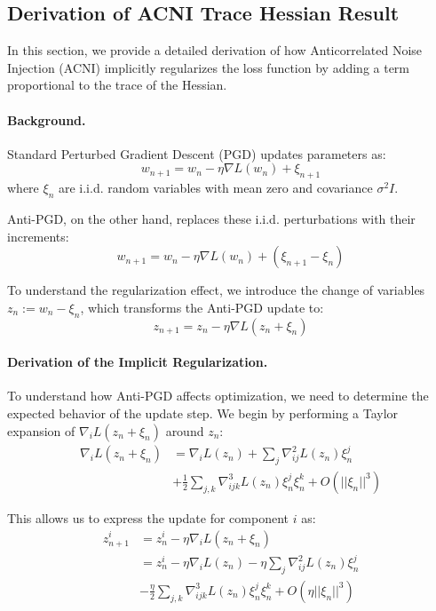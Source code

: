 \subsection*{Derivation of ACNI Trace Hessian Result}

In this section, we provide a detailed derivation of how Anticorrelated Noise Injection (ACNI) implicitly regularizes the loss function by adding a term proportional to the trace of the Hessian.

\paragraph{Background.}
Standard Perturbed Gradient Descent (PGD) updates parameters as:
\begin{equation}
w_{n+1} = w_n - \eta \nabla L(w_n) + \xi_{n+1}
\end{equation}
where $\xi_n$ are i.i.d. random variables with mean zero and covariance $\sigma^2I$.

Anti-PGD, on the other hand, replaces these i.i.d. perturbations with their increments:
\begin{equation}
w_{n+1} = w_n - \eta \nabla L(w_n) + (\xi_{n+1} - \xi_n)
\end{equation}

To understand the regularization effect, we introduce the change of variables $z_n := w_n - \xi_n$, which transforms the Anti-PGD update to:
\begin{equation}
z_{n+1} = z_n - \eta \nabla L(z_n + \xi_n)
\end{equation}

\paragraph{Derivation of the Implicit Regularization.}
To understand how Anti-PGD affects optimization, we need to determine the expected behavior of the update step. We begin by performing a Taylor expansion of $\nabla_i L(z_n + \xi_n)$ around $z_n$:
\begin{align}
\nabla_i L(z_n + \xi_n) &= \nabla_i L(z_n) + \sum_j \nabla^2_{ij}L(z_n) \xi^j_n \\
&+ \frac{1}{2}\sum_{j,k} \nabla^3_{ijk}L(z_n) \xi^j_n \xi^k_n + O(||\xi_n||^3)
\end{align}

This allows us to express the update for component $i$ as:
\begin{align}
z^i_{n+1} &= z^i_n - \eta \nabla_i L(z_n + \xi_n) \\
&= z^i_n - \eta \nabla_i L(z_n) - \eta \sum_j \nabla^2_{ij}L(z_n) \xi^j_n \\
&- \frac{\eta}{2}\sum_{j,k} \nabla^3_{ijk}L(z_n) \xi^j_n \xi^k_n + O(\eta||\xi_n||^3)
\end{align}

